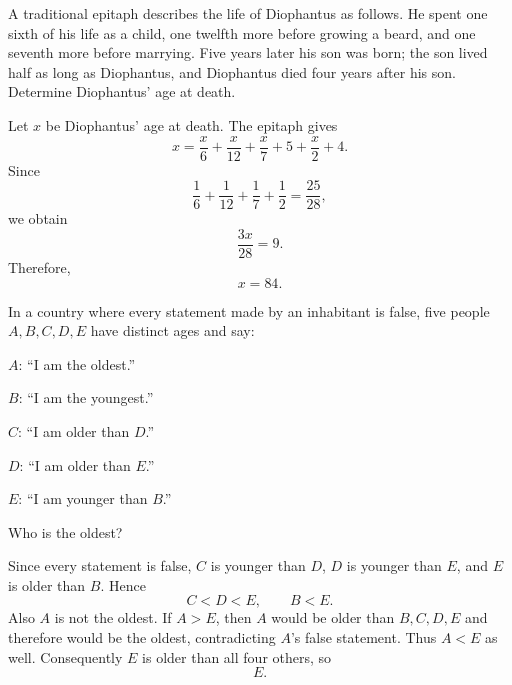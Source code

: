    \begin{expectedproblem}
        A traditional epitaph describes the life of Diophantus as follows. He
        spent one sixth of his life as a child, one twelfth more before growing
        a beard, and one seventh more before marrying. Five years later his son
        was born; the son lived half as long as Diophantus, and Diophantus died
        four years after his son. Determine Diophantus' age at death.
    \end{expectedproblem}

    \begin{solution}
        Let $x$ be Diophantus' age at death. The epitaph gives
        \[
            x
            =
            \frac{x}{6}
            +
            \frac{x}{12}
            +
            \frac{x}{7}
            +
            5
            +
            \frac{x}{2}
            +
            4.
        \]
        Since
        \[
            \frac16+\frac1{12}+\frac17+\frac12
            =
            \frac{25}{28},
        \]
        we obtain
        \[
            \frac{3x}{28}=9.
        \]
        Therefore,
        \[
            \boxed{x=84}.
        \]
    \end{solution}

    \begin{expectedproblem}
        In a country where every statement made by an inhabitant is false, five
        people $A,B,C,D,E$ have distinct ages and say:
        \begin{problemsubparts}
            \item $A$: ``I am the oldest.''
            \item $B$: ``I am the youngest.''
            \item $C$: ``I am older than $D$.''
            \item $D$: ``I am older than $E$.''
            \item $E$: ``I am younger than $B$.''
        \end{problemsubparts}
        Who is the oldest?
    \end{expectedproblem}

    \begin{solution}
        Since every statement is false, $C$ is younger than $D$, $D$ is
        younger than $E$, and $E$ is older than $B$. Hence
        \[
            C<D<E,
            \qquad
            B<E.
        \]
        Also $A$ is not the oldest. If $A>E$, then $A$ would be older than
        $B,C,D,E$ and therefore would be the oldest, contradicting $A$'s false
        statement. Thus $A<E$ as well. Consequently $E$ is older than all four
        others, so
        \[
            \boxed{E}.
        \]
    \end{solution}

